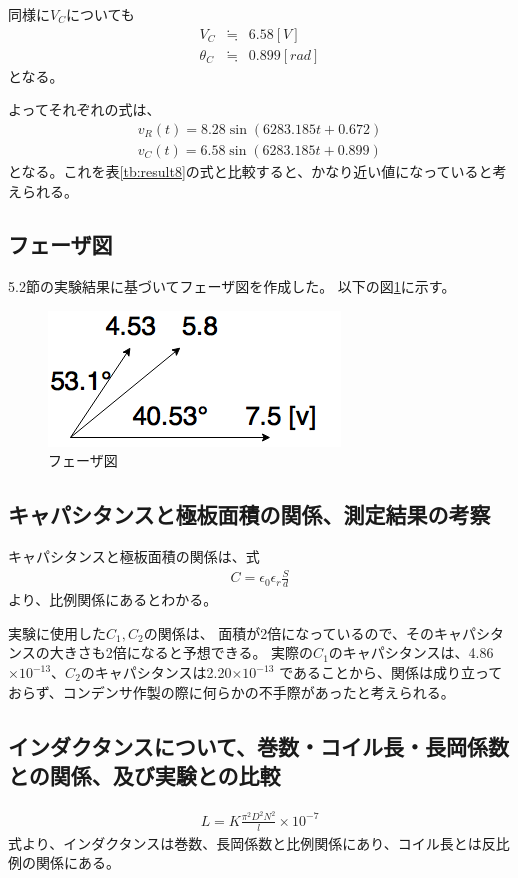 \documentclass[dvipdfmx]{jsarticle}
\begin{document}
同様に$V_C$についても
\begin{eqnarray*}
  V_C & \fallingdotseq & 6.58 [V]\\
  \theta_C & \fallingdotseq & 0.899 [rad]
\end{eqnarray*}
となる。

よってそれぞれの式は、
\begin{eqnarray*}
  v_R(t) = 8.28\sin(6283.185t + 0.672)\\
  v_C(t) = 6.58\sin(6283.185t + 0.899)
\end{eqnarray*}
となる。これを表\ref{tb:result8}の式と比較すると、かなり近い値になっていると考えられる。

\subsection{フェーザ図}
5.2節の実験結果に基づいてフェーザ図を作成した。
以下の図\ref{fig:f}に示す。
\begin{figure}[h]
  \centering
  \includegraphics[scale=0.4]{f.png}
  \caption{フェーザ図}
  \label{fig:f}
\end{figure}

\subsection{キャパシタンスと極板面積の関係、測定結果の考察}
キャパシタンスと極板面積の関係は、式
\begin{eqnarray*}
  C = \epsilon_0 \epsilon_r \frac{S}{d}
\end{eqnarray*}
より、比例関係にあるとわかる。

実験に使用した$C_1, C_2$の関係は、
面積が2倍になっているので、そのキャパシタンスの大きさも2倍になると予想できる。
実際の$C_1$のキャパシタンスは、4.86$\times 10^{-13}$、$C_2$のキャパシタンスは2.20$\times 10^{-13}$
であることから、関係は成り立っておらず、コンデンサ作製の際に何らかの不手際があったと考えられる。

\subsection{インダクタンスについて、巻数・コイル長・長岡係数との関係、及び実験との比較}
\begin{eqnarray*}
  L = K \frac{\pi^2 D^2 N^2}{l} \times 10^{-7}
\end{eqnarray*}
式より、インダクタンスは巻数、長岡係数と比例関係にあり、コイル長とは反比例の関係にある。
\end{document}
